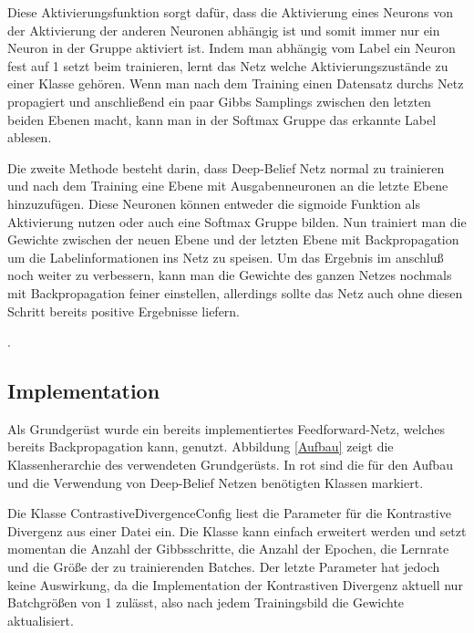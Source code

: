 \documentclass[12pt]{article}
\begin{document}
Diese Aktivierungsfunktion sorgt dafür, dass die Aktivierung eines Neurons von der Aktivierung der anderen Neuronen abhängig ist und somit immer nur ein Neuron in der Gruppe aktiviert ist. Indem man abhängig vom Label ein Neuron fest auf 1 setzt beim trainieren, lernt das Netz welche Aktivierungszustände zu einer Klasse gehören. Wenn man nach dem Training einen Datensatz durchs Netz propagiert und anschließend ein paar Gibbs Samplings zwischen den letzten beiden Ebenen macht, kann man in der Softmax Gruppe das erkannte Label ablesen.

Die zweite Methode besteht darin, dass Deep-Belief Netz normal zu trainieren und nach dem Training eine Ebene mit Ausgabenneuronen an die letzte Ebene hinzuzufügen. Diese Neuronen können entweder die sigmoide Funktion als Aktivierung nutzen oder auch eine Softmax Gruppe bilden. Nun trainiert man die Gewichte zwischen der neuen Ebene und der letzten Ebene mit Backpropagation um die Labelinformationen ins Netz zu speisen. Um das Ergebnis im anschluß noch weiter zu verbessern, kann man die Gewichte des ganzen Netzes nochmals mit Backpropagation feiner einstellen, allerdings sollte das Netz auch ohne diesen Schritt bereits positive Ergebnisse liefern.

\cite{backprop}. 

\subsection{Implementation}
Als Grundgerüst wurde ein bereits implementiertes Feedforward-Netz, welches bereits Backpropagation kann, genutzt. Abbildung \ref{Aufbau} zeigt die Klassenherarchie des verwendeten Grundgerüsts. In rot sind die für den Aufbau und die Verwendung von Deep-Belief Netzen benötigten Klassen markiert.

Die Klasse ContrastiveDivergenceConfig liest die Parameter für die Kontrastive Divergenz aus einer Datei ein. Die Klasse kann einfach erweitert werden und setzt momentan die Anzahl der Gibbsschritte, die Anzahl der Epochen, die Lernrate und die Größe der zu trainierenden Batches. Der letzte Parameter hat jedoch keine Auswirkung, da die Implementation der Kontrastiven Divergenz aktuell nur Batchgrößen von 1 zulässt, also nach jedem Trainingsbild die Gewichte aktualisiert.
\end{document}
